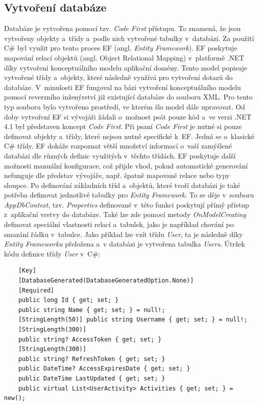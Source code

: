 \subsection{Vytvoření databáze}
\label{dbcreation}
Databáze je vytvořena pomocí tzv. \emph{Code First} přístupu. To znamená, že jsou vytvořeny objekty a~třídy a~podle nich vytvořené tabulky v~databázi. Za použití C\# byl využit pro tento proces EF (angl. \emph{Entity Framework}). EF poskytuje mapování relací objektů (angl. Object Relational Mapping) v~platformě .NET díky vytvoření konceptuálního modelu aplikační domény. Tento model popisuje vytvořené třídy a~objekty, které následně využívá pro vytvoření dotazů do databáze. V~minulosti EF fungoval na bázi vytvoření konceptuálního modelu pomocí reverzního inženýrství již existující databáze do souboru XML. Pro tento typ souboru bylo vytvořeno prostředí, ve kterém šlo model dále upravovat. Od doby vytvoření EF si vývojáři žádali o~možnost psát pouze kód a~ve verzi .NET 4.1 byl představen koncept \emph{Code First}. Při psaní \emph{Code First} je nutné si pouze definovat objekty a~třídy, které nejsou nutně specifické k~EF. Jedná se o~klasické C\# třídy. EF dokáže rozpoznat větší množství informací o~vaší zamýšlené databázi dle různých definic využitých v~těchto třídách. EF poskytuje další možnosti manuální konfigurace, což přijde vhod, pokud automatické generování nefunguje dle představ vývojáře, např. špatně mapované relace nebo typy sloupce. \cite{CodeFirst1,CodeFirst2}  
Po definování základních tříd a~objektů, které tvoří databázi je také potřeba definovat jednotlivé tabulky pro \emph{Entity Framework}. To se děje v~souboru \emph{AppDbContext}, tzv. \emph{Properties} definované v~této funkci poskytují přímý přístup z~aplikační vrstvy do databáze. Také lze zde pomocí metody \emph{OnModelCreating} definovat speciální vlastnosti relací a~tabulek, jako je například chování po smazání řádku v~tabulce. Jako příklad lze vzít třídu \emph{User}, ta je následně díky \emph{Entity Frameworku} přeložena a~v databázi je vytvořena tabulka \emph{Users}. Útržek kódu definice třídy \emph{User} v~C\#:   
\begin{verbatim}
    [Key]
    [DatabaseGenerated(DatabaseGeneratedOption.None)]
    [Required]
    public long Id { get; set; }
    public string Name { get; set; } = null!;
    [StringLength(50)] public string Username { get; set; } = null!;
    [StringLength(300)] 
    public string? AccessToken { get; set; }
    [StringLength(300)] 
    public string? RefreshToken { get; set; }
    public DateTime? AccessExpiresDate { get; set; }
    public DateTime LastUpdated { get; set; }
    public virtual List<UserActivity> Activities { get; set; } = new();
\end{verbatim}

